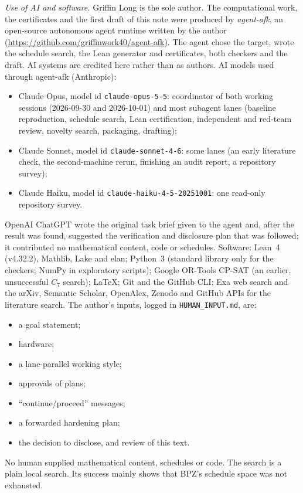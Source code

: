 \documentclass[11pt]{amsart}
\newcommand{\code}[1]{\texttt{#1}}
\begin{document}
\emph{Use of AI and software.} Griffin Long is the sole author. The computational work, the
certificates and the first draft of this note were produced by \emph{agent-afk}, an open-source
autonomous agent runtime written by the author (\url{https://github.com/griffinwork40/agent-afk}).
The agent chose the target, wrote the schedule search, the Lean generator and certificates, both
checkers and the draft. AI systems are credited here rather than as authors. AI models used through
agent-afk (Anthropic):
\begin{itemize}
\item Claude Opus, model id \code{claude-opus-5-5}: coordinator of both working sessions
(2026-09-30 and 2026-10-01) and most subagent lanes (baseline reproduction, schedule search, Lean
certification, independent and red-team review, novelty search, packaging, drafting);
\item Claude Sonnet, model id \code{claude-sonnet-4-6}: some lanes (an early literature check, the
second-machine rerun, finishing an audit report, a repository survey);
\item Claude Haiku, model id \code{claude-haiku-4-5-20251001}: one read-only repository survey.
\end{itemize}
OpenAI ChatGPT wrote the original task brief given to the agent and, after the result was found,
suggested the verification and disclosure plan that was followed; it contributed no mathematical
content, code or schedules. Software: Lean~4 (v4.32.2), Mathlib, Lake and elan; Python~3
(standard library only for the checkers; NumPy in exploratory scripts); Google OR-Tools CP-SAT (an
earlier, unsuccessful $C_7$ search); \LaTeX; Git and the GitHub CLI; Exa web search and the arXiv,
Semantic Scholar, OpenAlex, Zenodo and GitHub APIs for the literature search.
The author's inputs, logged in \code{HUMAN\_INPUT.md}, are:
\begin{itemize}
\item a goal statement;
\item hardware;
\item a lane-parallel working style;
\item approvals of plans;
\item ``continue/proceed'' messages;
\item a forwarded hardening plan;
\item the decision to disclose, and review of this text.
\end{itemize}
No human supplied mathematical content, schedules or code. The search is a plain local search.
Its success mainly shows that BPZ's schedule space was not exhausted.
\end{document}
